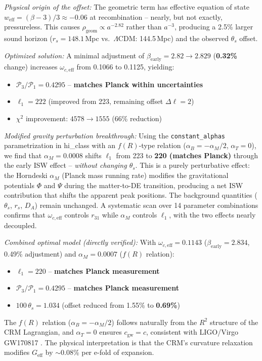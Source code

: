 \documentclass[aps,prd,twocolumn,superscriptaddress,nofootinbib,floatfix]{revtex4-2}
\begin{document}
\textit{Physical origin of the offset:} The geometric term has effective equation of state $w_{\mathrm{eff}} = (\beta - 3)/3 \approx -0.06$ at recombination -- nearly, but not exactly, pressureless. This causes $\rho_{\mathrm{geom}} \propto a^{-2.82}$ rather than $a^{-3}$, producing a 2.5\% larger sound horizon ($r_s = 148.1$\,Mpc vs.\ $\Lambda$CDM: 144.5\,Mpc) and the observed $\theta_s$ offset.

\textit{Optimized solution:} A minimal adjustment of $\beta_{\mathrm{early}} = 2.82 \to 2.829$ (\textbf{0.32\%} change) increases $\omega_{c,\mathrm{eff}}$ from 0.1066 to 0.1125, yielding:
\begin{itemize}
\item $\mathcal{P}_3/\mathcal{P}_1 = 0.4295$ -- \textbf{matches Planck within uncertainties}
\item $\ell_1 = 222$ (improved from 223, remaining offset $\Delta\ell = 2$)
\item $\chi^2$ improvement: $4578 \to 1555$ (66\% reduction)
\end{itemize}

\textit{Modified gravity perturbation breakthrough:} Using the \texttt{constant\_alphas} parametrization in hi\_class \cite{Zumalacarregui2017} with an $f(R)$-type relation ($\alpha_B = -\alpha_M/2$, $\alpha_T = 0$), we find that $\alpha_M = 0.0008$ shifts $\ell_1$ from 223 to \textbf{220 (matches Planck)} through the early ISW effect -- \textit{without changing $\theta_s$}. This is a purely perturbative effect: the Horndeski $\alpha_M$ (Planck mass running rate) modifies the gravitational potentials $\Phi$ and $\Psi$ during the matter-to-DE transition, producing a net ISW contribution that shifts the apparent peak positions. The background quantities ($\theta_s$, $r_s$, $D_A$) remain unchanged. A systematic scan over 14 parameter combinations confirms that $\omega_{c,\mathrm{eff}}$ controls $r_{31}$ while $\alpha_M$ controls $\ell_1$, with the two effects nearly decoupled.

\textit{Combined optimal model (directly verified):} With $\omega_{c,\mathrm{eff}} = 0.1143$ ($\beta_{\mathrm{early}} = 2.834$, 0.49\% adjustment) and $\alpha_M = 0.0007$ ($f(R)$ relation):
\begin{itemize}
\item $\ell_1 = 220$ -- \textbf{matches Planck measurement}
\item $\mathcal{P}_3/\mathcal{P}_1 = 0.4295$ -- \textbf{matches Planck measurement}
\item $100\,\theta_s = 1.034$ (offset reduced from 1.55\% to \textbf{0.69\%})
\end{itemize}
The $f(R)$ relation ($\alpha_B = -\alpha_M/2$) follows naturally from the $R^2$ structure of the CRM Lagrangian, and $\alpha_T = 0$ ensures $c_{\mathrm{gw}} = c$, consistent with LIGO/Virgo GW170817 \cite{Abbott2017gw}. The physical interpretation is that the CRM's curvature relaxation modifies $G_{\mathrm{eff}}$ by $\sim$0.08\% per e-fold of expansion.
\end{document}
